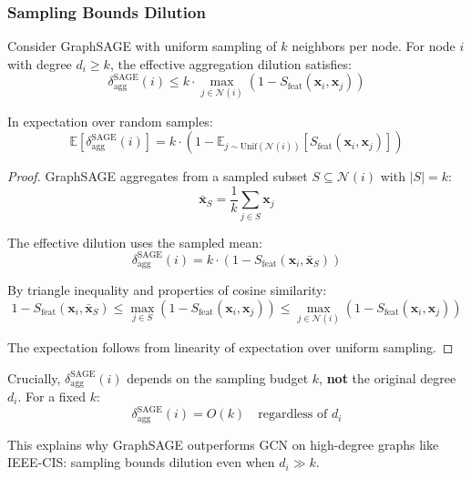\subsubsection{Sampling Bounds Dilution}

\begin{theorem}
\label{thm:sampling}
Consider GraphSAGE with uniform sampling of $k$ neighbors per node. For node $i$ with degree $d_i \geq k$, the effective aggregation dilution satisfies:
\begin{equation}
\delta_{\text{agg}}^{\text{SAGE}}(i) \leq k \cdot \max_{j \in \mathcal{N}(i)} \left(1 - S_{\text{feat}}(\mathbf{x}_i, \mathbf{x}_j)\right)
\end{equation}

In expectation over random samples:
\begin{equation}
\mathbb{E}\left[\delta_{\text{agg}}^{\text{SAGE}}(i)\right] = k \cdot \left(1 - \mathbb{E}_{j \sim \text{Unif}(\mathcal{N}(i))}[S_{\text{feat}}(\mathbf{x}_i, \mathbf{x}_j)]\right)
\end{equation}
\end{theorem}

\begin{proof}
GraphSAGE aggregates from a sampled subset $S \subseteq \mathcal{N}(i)$ with $|S| = k$:
\begin{equation}
\bar{\mathbf{x}}_S = \frac{1}{k} \sum_{j \in S} \mathbf{x}_j
\end{equation}

The effective dilution uses the sampled mean:
\begin{equation}
\delta_{\text{agg}}^{\text{SAGE}}(i) = k \cdot \left(1 - S_{\text{feat}}(\mathbf{x}_i, \bar{\mathbf{x}}_S)\right)
\end{equation}

By triangle inequality and properties of cosine similarity:
\begin{equation}
1 - S_{\text{feat}}(\mathbf{x}_i, \bar{\mathbf{x}}_S) \leq \max_{j \in S} \left(1 - S_{\text{feat}}(\mathbf{x}_i, \mathbf{x}_j)\right) \leq \max_{j \in \mathcal{N}(i)} \left(1 - S_{\text{feat}}(\mathbf{x}_i, \mathbf{x}_j)\right)
\end{equation}

The expectation follows from linearity of expectation over uniform sampling.
\end{proof}

\begin{corollary}
\label{cor:sampling}
Crucially, $\delta_{\text{agg}}^{\text{SAGE}}(i)$ depends on the sampling budget $k$, \textbf{not} the original degree $d_i$. For a fixed $k$:
\begin{equation}
\delta_{\text{agg}}^{\text{SAGE}}(i) = O(k) \quad \text{regardless of } d_i
\end{equation}

This explains why GraphSAGE outperforms GCN on high-degree graphs like IEEE-CIS: sampling bounds dilution even when $d_i \gg k$.
\end{corollary}

